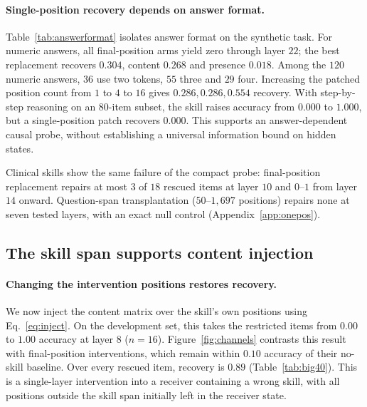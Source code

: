 \documentclass{article}
\begin{document}
\paragraph{Single-position recovery depends on answer format.}
\label{sec:onepos}
Table~\ref{tab:answerformat} isolates answer format on the synthetic task.
For numeric answers, all final-position arms yield zero through layer $22$;
the best replacement recovers $0.304$, content $0.268$ and presence $0.018$.
Among the $120$ numeric answers, $36$ use two tokens, $55$ three and $29$ four.
Increasing the patched position count from $1$ to $4$ to $16$ gives
$0.286,0.286,0.554$ recovery. With step-by-step reasoning on an $80$-item subset,
the skill raises accuracy from $0.000$ to $1.000$, but a single-position patch
recovers $0.000$. This supports an answer-dependent causal probe, without
establishing a universal information bound on hidden states.

\begin{table}[t]
\caption{One final-position probe across answer formats, Qwen3-8B (pre-fix).
Multiple choice and numeric answers use the same $120$ items; reasoning uses an
$80$-item subset with the same skill. Recovery is the best state-replacement
result over tested layers on each format's rescued cell.}
\label{tab:answerformat}
\centering\small

\end{table}

Clinical skills show the same failure of the compact probe: final-position
replacement repairs at most $3$ of $18$ rescued items at layer $10$ and $0$--$1$
from layer $14$ onward. Question-span transplantation ($50$--$1{,}697$ positions)
repairs none at seven tested layers, with an exact null control
(Appendix~\ref{app:onepos}).

\subsection{The skill span supports content injection}
\label{sec:battery}

\paragraph{Changing the intervention positions restores recovery.}
We now inject the content matrix over the skill's own positions using
Eq.~\ref{eq:inject}. On the development set, this takes the restricted items
from $0.00$ to $1.00$ accuracy at layer $8$ ($n=16$).
Figure~\ref{fig:channels} contrasts this result with final-position interventions,
which remain within $0.10$ accuracy of their no-skill baseline. Over every
rescued item, recovery is $0.89$ (Table~\ref{tab:big40}). This is a
single-layer intervention into a receiver containing a wrong skill, with all
positions outside the skill span initially left in the receiver state.
\end{document}
